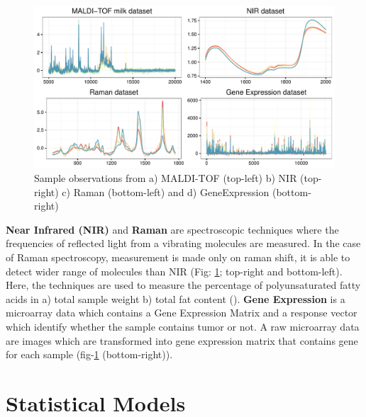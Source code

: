 \documentclass[10pt, a4paper]{article}\usepackage[]{graphicx}\usepackage[]{color}
\makeatletter
\def\maxwidth{ %
  \ifdim\Gin@nat@width>\linewidth
    \linewidth
  \else
    \Gin@nat@width
  \fi
}
\newenvironment{knitrout}{}{} %
\makeatother
\begin{document}
\begin{knitrout}\small
{}\color{fgcolor}\begin{figure}[H]
\includegraphics[width=\maxwidth]{figure/samplePlot-1} \caption[Sample observations from a) MALDI-TOF (top-left) b) NIR (top-right) c) Raman (bottom-left) and d) GeneExpression (bottom-right)]{Sample observations from a) MALDI-TOF (top-left) b) NIR (top-right) c) Raman (bottom-left) and d) GeneExpression (bottom-right)}\label{fig:samplePlot}
\end{figure}


\end{knitrout}

\textbf{Near Infrared (NIR)} and \textbf{Raman} are spectroscopic techniques where the frequencies of reflected light from a vibrating molecules are measured. In the case of Raman spectroscopy, measurement is made only on raman shift, it is able to detect wider range of molecules than NIR (Fig: \ref{fig:samplePlot}; top-right and bottom-left). Here, the techniques are used to measure the percentage of polyunsaturated fatty acids in a) total sample weight b) total fat content (\cite{naes2013multi}). \textbf{Gene Expression} is a microarray data which contains a Gene Expression Matrix and a response vector which identify whether the sample contains tumor or not. A raw microarray data are images which are transformed into gene expression matrix that contains gene for each sample (fig-\ref{fig:samplePlot} (bottom-right)).






\section{Statistical Models}
\end{document}
